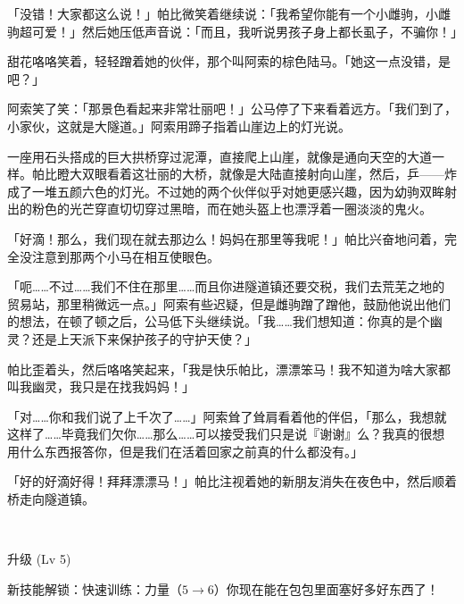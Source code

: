 「没错！大家都这么说！」帕比微笑着继续说：「我希望你能有一个小雌驹，小雌驹超可爱！」然后她压低声音说：「而且，我听说男孩子身上都长虱子，不骗你！」

甜花咯咯笑着，轻轻蹭着她的伙伴，那个叫阿索的棕色陆马。「她这一点没错，是吧？」

阿索笑了笑：「那景色看起来非常壮丽吧！」公马停了下来看着远方。「我们到了，小家伙，这就是大隧道。」阿索用蹄子指着山崖边上的灯光说。

一座用石头搭成的巨大拱桥穿过泥潭，直接爬上山崖，就像是通向天空的大道一样。帕比瞪大双眼看着这壮丽的大桥，就像是大陆直接射向山崖，然后，乒——炸成了一堆五颜六色的灯光。不过她的两个伙伴似乎对她更感兴趣，因为幼驹双眸射出的粉色的光芒穿直切切穿过黑暗，而在她头盔上也漂浮着一圈淡淡的鬼火。

「好滴！那么，我们现在就去那边么！妈妈在那里等我呢！」帕比兴奋地问着，完全没注意到那两个小马在相互使眼色。

「呃……不过……我们不住在那里……而且你进隧道镇还要交税，我们去荒芜之地的贸易站，那里稍微远一点。」阿索有些迟疑，但是雌驹蹭了蹭他，鼓励他说出他们的想法，在顿了顿之后，公马低下头继续说。「我……我们想知道：你真的是个幽灵？还是上天派下来保护孩子的守护天使？」

帕比歪着头，然后咯咯笑起来，「我是快乐帕比，漂漂笨马！我不知道为啥大家都叫我幽灵，我只是在找我妈妈！」

「对……你和我们说了上千次了……」阿索耸了耸肩看着他的伴侣，「那么，我想就这样了……毕竟我们欠你……那么……可以接受我们只是说『谢谢』么？我真的很想用什么东西报答你，但是我们在活着回家之前真的什么都没有。」

「好的好滴好得！拜拜漂漂马！」帕比注视着她的新朋友消失在夜色中，然后顺着桥走向隧道镇。

~\vfill

\begin{note}
    升级 (Lv 5)

    新技能解锁：快速训练：力量（$5 \to 6$）你现在能在包包里面塞好多好东西了！
\end{note}



